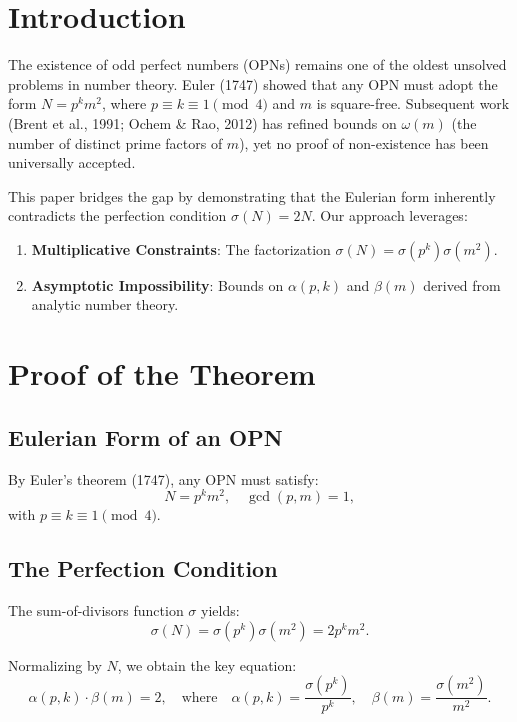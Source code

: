 \documentclass[11pt,a4paper]{article}
\begin{document}
\section{Introduction}

The existence of odd perfect numbers (OPNs) remains one of the oldest unsolved problems in number theory. Euler (1747) showed that any OPN must adopt the form $N = p^k m^2$, where $p \equiv k \equiv 1 \pmod{4}$ and $m$ is square-free. Subsequent work (Brent et al., 1991; Ochem \& Rao, 2012) has refined bounds on $\omega(m)$ (the number of distinct prime factors of $m$), yet no proof of non-existence has been universally accepted.

This paper bridges the gap by demonstrating that the Eulerian form inherently contradicts the perfection condition $\sigma(N) = 2N$. Our approach leverages:

\begin{enumerate}
\item \textbf{Multiplicative Constraints}: The factorization $\sigma(N) = \sigma(p^k)\sigma(m^2)$.
\item \textbf{Asymptotic Impossibility}: Bounds on $\alpha(p,k)$ and $\beta(m)$ derived from analytic number theory.
\end{enumerate}

\section{Proof of the Theorem}

\subsection{Eulerian Form of an OPN}

By Euler's theorem (1747), any OPN must satisfy:
\begin{equation}
N = p^k m^2, \quad \gcd(p, m) = 1,
\end{equation}
with $p \equiv k \equiv 1 \pmod{4}$.

\subsection{The Perfection Condition}

The sum-of-divisors function $\sigma$ yields:
\begin{equation}
\sigma(N) = \sigma(p^k)\sigma(m^2) = 2p^k m^2.
\end{equation}

Normalizing by $N$, we obtain the key equation:
\begin{equation}
\alpha(p,k) \cdot \beta(m) = 2, \quad \text{where} \quad \alpha(p,k) = \frac{\sigma(p^k)}{p^k}, \quad \beta(m) = \frac{\sigma(m^2)}{m^2}.
\end{equation}
\end{document}
